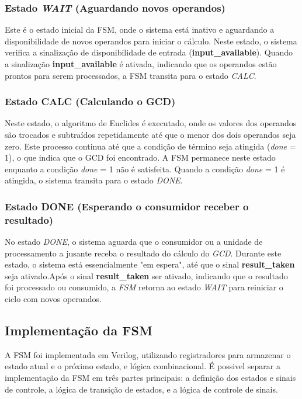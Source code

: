 \documentclass[a4paper,11pt]{article} %
\begin{document}
\subsubsection{Estado \textit{WAIT} (Aguardando novos operandos)}
Este é o estado inicial da FSM, onde o sistema está inativo e
aguardando a disponibilidade de novos operandos para iniciar o
cálculo. Neste estado, o sistema verifica a sinalização de
disponibilidade de entrada (\textbf{input\_available}). Quando
a sinalização \textbf{input\_available} é ativada, indicando que
os operandos estão prontos para serem processados, a FSM
transita para o estado \textit{CALC}.

\subsubsection{Estado CALC (Calculando o GCD)}
Neste estado, o algoritmo de Euclides é executado, onde
os valores dos operandos são trocados e subtraídos
repetidamente até que o menor dos dois operandos seja zero.
Este processo continua até que a condição de término seja
atingida (\textit{done} = 1), o que indica que o GCD foi encontrado.
A FSM permanece neste estado enquanto a condição \textit{done} = 1
não é satisfeita. Quando a condição \textit{done} = 1 é atingida,
o sistema transita para o estado \textit{DONE}.

\subsubsection{Estado DONE (Esperando o consumidor receber o resultado)}
No estado \textit{DONE}, o sistema aguarda que o consumidor ou a
unidade de processamento a jusante receba o resultado do
cálculo do \textit{GCD}. Durante este estado, o sistema está
essencialmente "em espera", até que o sinal \textbf{result\_taken}
seja ativado.Após o sinal \textbf{result\_taken} ser ativado,
indicando que o resultado foi processado ou consumido,
a \textit{FSM} retorna ao estado \textit{WAIT} para reiniciar o ciclo
com novos operandos.


\subsection{Implementação da FSM}

A FSM foi implementada em Verilog, utilizando registradores
para armazenar o estado atual e o próximo estado, e lógica
combinacional. É possivel separar a implementação da FSM em
três partes principais: a definição dos estados e sinais de
controle, a lógica de transição de estados, e a lógica de
controle de sinais.
\end{document}
